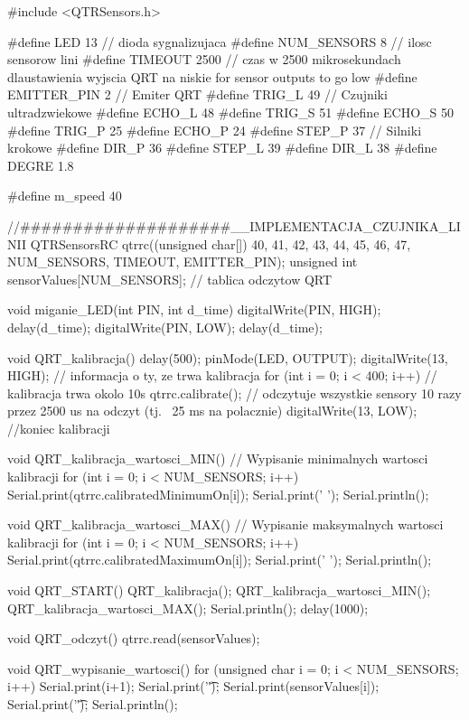 #include <QTRSensors.h>

#define LED           13    // dioda sygnalizujaca
#define NUM_SENSORS   8     // ilosc sensorow lini
#define TIMEOUT       2500  // czas w 2500 mikrosekundach dlaustawienia wyjscia QRT na niskie for sensor outputs to go low
#define EMITTER_PIN   2     // Emiter QRT
#define TRIG_L        49    // Czujniki ultradzwiekowe
#define ECHO_L        48
#define TRIG_S        51
#define ECHO_S        50
#define TRIG_P        25
#define ECHO_P        24
#define STEP_P        37    // Silniki krokowe
#define DIR_P         36
#define STEP_L        39
#define DIR_L         38
#define DEGRE         1.8

#define m_speed       40

//####################__IMPLEMENTACJA_CZUJNIKA_LINII
QTRSensorsRC qtrrc((unsigned char[]) {40, 41, 42, 43, 44, 45, 46, 47}, NUM_SENSORS, TIMEOUT, EMITTER_PIN); 
unsigned int sensorValues[NUM_SENSORS]; // tablica odczytow QRT

void miganie_LED(int PIN, int d_time) {
  digitalWrite(PIN, HIGH);
  delay(d_time);
  digitalWrite(PIN, LOW);
  delay(d_time);
}

void QRT_kalibracja(){
  delay(500);
  pinMode(LED, OUTPUT);
  digitalWrite(13, HIGH);        // informacja o ty, ze trwa kalibracja
  for (int i = 0; i < 400; i++)  // kalibracja trwa okolo 10s
    qtrrc.calibrate();           // odczytuje wszystkie sensory 10 razy przez 2500 us na odczyt (tj. ~25 ms na polacznie)
  digitalWrite(13, LOW);         //koniec kalibracji
}

void QRT_kalibracja_wartosci_MIN(){ // Wypisanie minimalnych wartosci kalibracji
   for (int i = 0; i < NUM_SENSORS; i++)
  {
    Serial.print(qtrrc.calibratedMinimumOn[i]);
    Serial.print(' ');
  }
  Serial.println();
}

void QRT_kalibracja_wartosci_MAX(){ // Wypisanie maksymalnych wartosci kalibracji
  for (int i = 0; i < NUM_SENSORS; i++)
  {
    Serial.print(qtrrc.calibratedMaximumOn[i]);
    Serial.print(' ');
  }
  Serial.println();
}

void QRT_START(){
  QRT_kalibracja();
  QRT_kalibracja_wartosci_MIN();
  QRT_kalibracja_wartosci_MAX();
  Serial.println();
  delay(1000);
}

void QRT_odczyt(){
  qtrrc.read(sensorValues);
}

void QRT_wypisanie_wartosci(){
  for (unsigned char i = 0; i < NUM_SENSORS; i++)
  {
    Serial.print(i+1);
    Serial.print('\t');
    Serial.print(sensorValues[i]);
    Serial.print('\t');
  }
  Serial.println();
}

